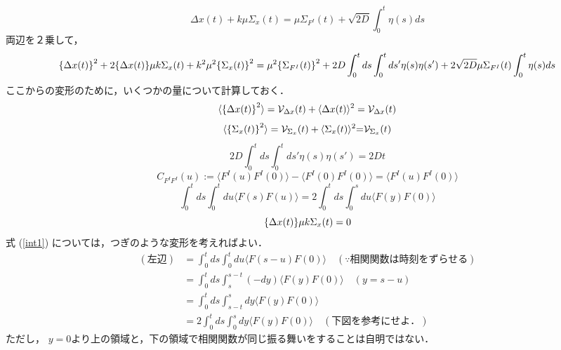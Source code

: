 \documentclass{jsarticle}
\numberwithin{equation}{section}
\theoremstyle{definition}
\begin{document}
\begin{equation}
  \Delta x(t) + k \mu \Sigma_x (t) = \mu \Sigma_{F^I} (t) + \sqrt{2D} \int_0^t \eta(s) ds 
\end{equation}
両辺を２乗して，
\begin{equation}
  \label{totyu4}
  \qty{\Delta x(t)}^2 + 2 \qty{\Delta x(t)} \mu k \Sigma_x (t) + k^2 \mu^2 \qty{\Sigma_x (t)}^2 = \mu^2 \qty{\Sigma_{F^I} (t) }^2 + 2D \int_0^t ds \int_0^t ds' \eta(s) \eta(s') + 2 \sqrt{2D} \mu \Sigma_{F^I} (t) \int_0^t \eta (s) ds 
\end{equation}
ここからの変形のために，いくつかの量について計算しておく．
\begin{equation}
  \label{totyu5}
  \langle \qty{\Delta x(t)}^2 \rangle = \mathcal{V} _{\Delta x} (t) + \langle \Delta x(t) \rangle ^2 = \mathcal{V} _{\Delta x} (t)
\end{equation}
\begin{equation}
  \langle \qty{\Sigma_x (t)}^2 \rangle = \mathcal{V} _{\Sigma_x} (t) + \langle \Sigma_x (t) \rangle ^2 {=} \mathcal{V} _{\Sigma_x} (t) 
\end{equation}
\begin{equation}
  2D \int_0^t ds \int_0^t ds' \eta(s) \eta(s') = 2Dt 
\end{equation}
\begin{equation}
  C_{F^I F^I} (u) := \langle F^I (u) F^I (0) \rangle - \langle F^I (0) F^I (0) \rangle = \langle F^I (u) F^I (0) \rangle
\end{equation}
\begin{equation}
  \label{int1}
  \int_0^t ds \int_0^t du \langle F(s) F(u) \rangle = 2 \int_0^t ds \int_0^s du \langle F(y) F(0) \rangle
\end{equation}
\begin{equation}
  \label{totyu3}
  \qty{\Delta x(t)} \mu k \Sigma_x (t) = 0
\end{equation}
式 (\ref{int1}) については，つぎのような変形を考えればよい．
\begin{align}
  (\text{左辺}) &= \int_0^t ds \int_0^t du \langle F(s-u) F(0) \rangle \quad (\because \text{相関関数は時刻をずらせる}) \\
  &= \int_0^t ds \int_s^{s-t} (-dy) \langle F(y) F(0) \rangle \quad (y = s - u) \\
  &= \int_0^t ds \int_{s-t}^s dy \langle F(y) F(0) \rangle \\
  &= 2 \int_0^t ds \int_0^s dy \langle F(y) F(0) \rangle \quad (\text{下図を参考にせよ．})
\end{align}
ただし， $y = 0$より上の領域と，下の領域で相関関数が同じ振る舞いをすることは自明ではない．
\end{document}
